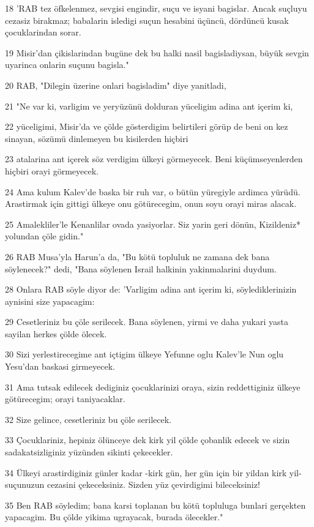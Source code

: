 \par 18 'RAB tez öfkelenmez, sevgisi engindir, suçu ve isyani bagislar. Ancak suçluyu cezasiz birakmaz; babalarin isledigi suçun hesabini üçüncü, dördüncü kusak çocuklarindan sorar.
\par 19 Misir'dan çikislarindan bugüne dek bu halki nasil bagisladiysan, büyük sevgin uyarinca onlarin suçunu bagisla."
\par 20 RAB, "Dilegin üzerine onlari bagisladim" diye yanitladi,
\par 21 "Ne var ki, varligim ve yeryüzünü dolduran yüceligim adina ant içerim ki,
\par 22 yüceligimi, Misir'da ve çölde gösterdigim belirtileri görüp de beni on kez sinayan, sözümü dinlemeyen bu kisilerden hiçbiri
\par 23 atalarina ant içerek söz verdigim ülkeyi görmeyecek. Beni küçümseyenlerden hiçbiri orayi görmeyecek.
\par 24 Ama kulum Kalev'de baska bir ruh var, o bütün yüregiyle ardimca yürüdü. Arastirmak için gittigi ülkeye onu götürecegim, onun soyu orayi miras alacak.
\par 25 Amalekliler'le Kenanlilar ovada yasiyorlar. Siz yarin geri dönün, Kizildeniz* yolundan çöle gidin."
\par 26 RAB Musa'yla Harun'a da, "Bu kötü topluluk ne zamana dek bana söylenecek?" dedi, "Bana söylenen Israil halkinin yakinmalarini duydum.
\par 28 Onlara RAB söyle diyor de: 'Varligim adina ant içerim ki, söylediklerinizin aynisini size yapacagim:
\par 29 Cesetleriniz bu çöle serilecek. Bana söylenen, yirmi ve daha yukari yasta sayilan herkes çölde ölecek.
\par 30 Sizi yerlestirecegime ant içtigim ülkeye Yefunne oglu Kalev'le Nun oglu Yesu'dan baskasi girmeyecek.
\par 31 Ama tutsak edilecek dediginiz çocuklarinizi oraya, sizin reddettiginiz ülkeye götürecegim; orayi taniyacaklar.
\par 32 Size gelince, cesetleriniz bu çöle serilecek.
\par 33 Çocuklariniz, hepiniz ölünceye dek kirk yil çölde çobanlik edecek ve sizin sadakatsizliginiz yüzünden sikinti çekecekler.
\par 34 Ülkeyi arastirdiginiz günler kadar -kirk gün, her gün için bir yildan kirk yil- suçunuzun cezasini çekeceksiniz. Sizden yüz çevirdigimi bileceksiniz!
\par 35 Ben RAB söyledim; bana karsi toplanan bu kötü topluluga bunlari gerçekten yapacagim. Bu çölde yikima ugrayacak, burada ölecekler."
